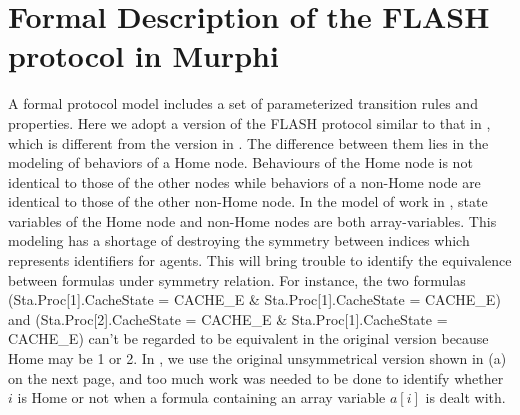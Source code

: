 \documentclass{llncs-new}
\begin{document}





\section{Formal Description of the FLASH protocol in Murphi\label{sec:formalDescription}}
A formal protocol model includes a set of parameterized transition rules and properties.  Here we adopt a version of the FLASH protocol similar to that in \cite{cubeicBeyond}, which is different from the version in \cite{Chou2004}. The difference between them lies in the modeling of behaviors of a Home node. Behaviours of the Home node is not identical to those of the other nodes while behaviors of
 a non-Home node are identical to those of the other non-Home node. In the model of work in \cite{Chou2004}, state variables of the Home node and non-Home nodes are both array-variables. This modeling has a shortage of destroying the symmetry between indices which represents identifiers for agents. This will bring trouble to identify the equivalence between formulas under symmetry relation. For instance,  the two formulas (Sta.Proc[1].CacheState = CACHE\_E \& Sta.Proc[1].CacheState = CACHE\_E) and (Sta.Proc[2].CacheState = CACHE\_E \& Sta.Proc[1].CacheState = CACHE\_E) can't be regarded to be equivalent in the original version because Home may be 1 or 2.  In \cite{LiCache16a}, we use the original unsymmetrical version shown in (a) on the next page, and too much work was needed to be done to identify whether $i$ is Home or not when   a formula containing an array variable $a[i]$ is dealt with.
\end{document}
